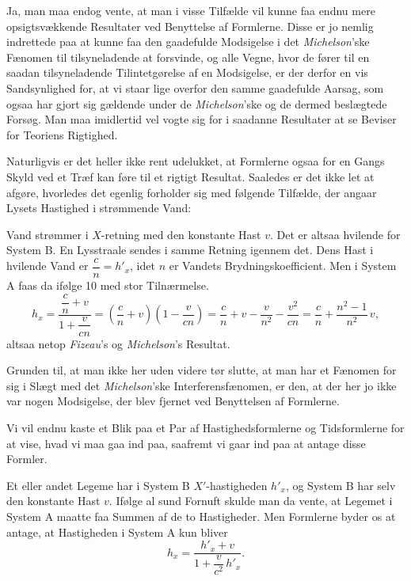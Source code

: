 \documentclass[12pt,a4paper]{article}
\newcommand{\opage}[1]{\marginnote{\footnotesize\textit{[#1]}}}
\begin{document}
\opage{24} Ja, man maa endog vente, at man i visse Tilfælde vil kunne faa endnu mere
opsigtsvækkende Resultater ved Benyttelse af Formlerne. Disse er jo nemlig
indrettede paa at kunne faa den gaadefulde Modsigelse i det
\emph{Michelson}'ske Fænomen til tilsyneladende at forsvinde, og alle Vegne,
hvor de fører til en saadan tilsyneladende Tilintetgørelse af en Modsigelse, er
der derfor en vis Sandsynlighed for, at vi staar lige overfor den samme
gaadefulde Aarsag, som ogsaa har gjort sig gældende under de
\emph{Michelson}'ske og de dermed beslægtede Forsøg. Man maa imidlertid vel
vogte sig for i saadanne Resultater at se Beviser for Teoriens Rigtighed.

Naturligvis er det heller ikke rent udelukket, at Formlerne ogsaa for en Gangs
Skyld ved et Træf kan føre til et rigtigt Resultat. Saaledes er det ikke let at
afgøre, hvorledes det egenlig forholder sig med følgende Tilfælde, der angaar
Lysets Hastighed i strømmende Vand:

Vand strømmer i $X$-retning med den konstante Hast $v$. Det er altsaa hvilende
for System B. En Lysstraale sendes i samme Retning igennem det. Dens Hast i
hvilende Vand er $\dfrac{c}{n} = h'_{x}$, idet $n$ er Vandets
Brydningskoefficient. Men i System A faas da ifølge 10 med stor Tilnærmelse.
\[
  h_{x} = \frac{\dfrac{c}{n} + v}{1 + \dfrac{v}{cn}}
        = \left(\frac{c}{n} + v\right)\left(1 - \frac{v}{cn}\right)
        = \frac{c}{n} + v - \frac{v}{n^{2}} - \frac{v^{2}}{cn}
        = \frac{c}{n} + \frac{n^{2} - 1}{n^{2}}\,v,
\]
altsaa netop \emph{Fizeau}'s og \emph{Michelson}'s Resultat.

Grunden til, at man ikke her uden videre tør slutte, at man har et Fænomen for
sig i Slægt med det \emph{Michelson}'ske Interferensfænomen, er den, at der her
jo ikke var nogen Modsigelse, der blev fjernet ved Benyttelsen af Formlerne.

Vi vil endnu kaste et Blik paa et Par af Hastighedsformlerne og Tidsformlerne
for at vise, hvad vi maa gaa ind paa, saafremt vi gaar ind paa at antage disse
Formler.

Et eller andet Legeme har i System B $X'$-hastigheden $h'_{x}$, og System B har
selv den konstante Hast $v$. Ifølge al sund Fornuft skulde man da vente, at
Legemet i System A maatte faa Summen
\opage{25} af de to Hastigheder. Men Formlerne byder os at antage, at Hastigheden i System
A kun bliver
\[
  h_{x} = \frac{h'_{x} + v}{1 + \dfrac{v}{c^{2}}\,h'_{x}}.
\]
\end{document}
